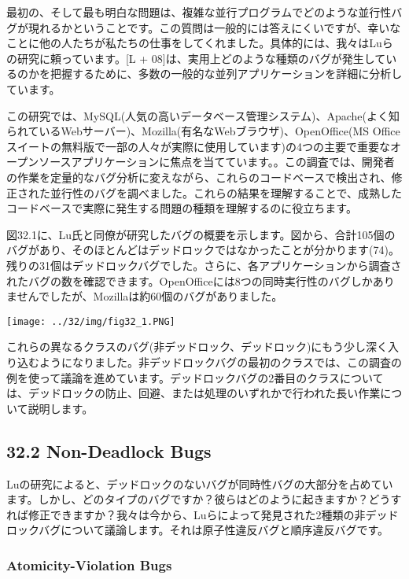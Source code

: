 最初の、そして最も明白な問題は、複雑な並行プログラムでどのような並行性バグが現れるかということです。この質問は一般的には答えにくいですが、幸いなことに他の人たちが私たちの仕事をしてくれました。具体的には、我々はLuらの研究に頼っています。{[}L
+
08{]}は、実用上どのような種類のバグが発生しているのかを把握するために、多数の一般的な並列アプリケーションを詳細に分析しています。

この研究では、MySQL(人気の高いデータベース管理システム)、Apache(よく知られているWebサーバー)、Mozilla(有名なWebブラウザ)、OpenOffice(MS
Officeスイートの無料版で一部の人々が実際に使用しています)の4つの主要で重要なオープンソースアプリケーションに焦点を当てています。。この調査では、開発者の作業を定量的なバグ分析に変えながら、これらのコードベースで検出され、修正された並行性のバグを調べました。これらの結果を理解することで、成熟したコードベースで実際に発生する問題の種類を理解するのに役立ちます。

図32.1に、Lu氏と同僚が研究したバグの概要を示します。図から、合計105個のバグがあり、そのほとんどはデッドロックではなかったことが分かります(74)。残りの31個はデッドロックバグでした。さらに、各アプリケーションから調査されたバグの数を確認できます。OpenOfficeには8つの同時実行性のバグしかありませんでしたが、Mozillaは約60個のバグがありました。

\texttt{[image: ../32/img/fig32\_1.PNG]}

これらの異なるクラスのバグ(非デッドロック、デッドロック)にもう少し深く入り込むようになりました。非デッドロックバグの最初のクラスでは、この調査の例を使って議論を進めています。デッドロックバグの2番目のクラスについては、デッドロックの防止、回避、または処理のいずれかで行われた長い作業について説明します。

\hypertarget{non-deadlock-bugs}{%
\subsection*{32.2 Non-Deadlock Bugs}\label{non-deadlock-bugs}}

Luの研究によると、デッドロックのないバグが同時性バグの大部分を占めています。しかし、どのタイプのバグですか？彼らはどのように起きますか？どうすれば修正できますか？我々は今から、Luらによって発見された2種類の非デッドロックバグについて議論します。それは原子性違反バグと順序違反バグです。

\hypertarget{atomicity-violation-bugs}{%
\subsubsection*{Atomicity-Violation
Bugs}\label{atomicity-violation-bugs}}

